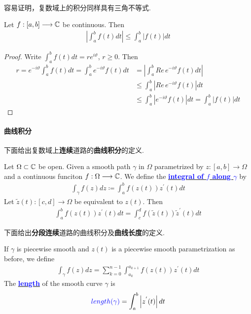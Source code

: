 	\vspace{2em}
	容易证明，复数域上的积分同样具有三角不等式.
	\begin{proposition}\label{prop 4.1.1}
		Let $f : [a , b] \longrightarrow \mathbb{C}$ be continuous. Then 
		\begin{align}
			\left| \int_{a}^{b}{f(t) dt} \right| \leq \int_{a}^{b}{\left| f(t) \right| dt}
		\end{align}
	
		\vspace{2em}
		\begin{proof}
			Write $\int_{a}^{b}{f(t) dt} = r e^{i\vartheta}$, $r \geq 0$. Then
			\begin{align}
				r = e^{-i\vartheta} \int_{a}^{b}{f(t) dt} = \int_{a}^{b}{e^{-i\vartheta} f(t) dt} 
				&= \left| \int_{a}^{b}{Re \, e^{-i\vartheta} f(t) dt} \right| \\
				&\leq \int_{a}^{b}{\left| Re \, e^{-i\vartheta} f(t) \right| dt} \\
				&\leq \int_{a}^{b}{\left| e^{-i\vartheta} f(t) \right| dt} = \int_{a}^{b}{\left| f(t) \right| dt}
			\end{align}
		\end{proof}
	\end{proposition}

\newpage
\paragraph{曲线积分}
	下面给出复数域上\textbf{连续}道路的\textbf{曲线积分}的定义.
	\begin{defn}\label{def 4.1.2}
		Let $\Omega \subset \mathbb{C}$ be open. Given a smooth path $\gamma$ in $\Omega$ parametrized by $z : [a , b] \longrightarrow \Omega$ and a continuous funciton $f : \Omega \longrightarrow \mathbb{C}$. We define the \underline{\textcolor{blue}{\textbf{integral of $f$ along $\gamma$}}} by
		\begin{align}
			\int_{\gamma}{f(z) dz} \coloneqq \int_{a}^{b}{f(z(t)) z^{'}(t) dt}
		\end{align}
		Let $\widetilde{z}(t) : [c , d] \longrightarrow \Omega$ be equivalent to $z(t)$. Then
		\begin{align}
			\int_{a}^{b}{f(z(t)) z^{'}(t) dt} = \int_{c}^{d}{f(\widetilde{z}(t)) \widetilde{z}^{'}(t) dt}
		\end{align}
	\end{defn}

	\vspace{2em}
	下面给出\textbf{分段连续}道路的曲线积分及\textbf{曲线长度}的定义.
	\begin{defn}\label{def 4.1.3}
		If $\gamma$ is piecewise smooth and $z(t)$ is a piecewise smooth parametrization as before, we define
		\begin{align}
			\int_{\gamma}{f(z) dz} = \sum_{k = 0}^{n - 1}{\int_{a_{k}}^{a_{k + 1}}{f(z(t)) z^{'}(t) dt}}
		\end{align}
		The \underline{\textcolor{blue}{\textbf{length}}} of the smooth curve $\gamma$ is 
		\begin{align}
			\textcolor{blue}{length(\gamma)} = \int_{a}^{b}{\left| z^{'}(t) \right| dt}
		\end{align}
	\end{defn}

